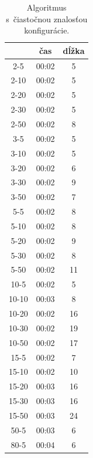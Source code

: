 \documentclass[
  printed, %
  oneside, %
  notable,   %
  nolof,     %
  nolot,     %
]{fithesis3}
\begin{document}
\begin{table}[hp!]
\centering
\begin{tabular}{c|c|c}
 & čas & dĺžka \\ \hline
2-5  & \cellcolor{table-green}00:02 & \cellcolor{table-green}5 \\ 
2-10  & \cellcolor{table-green}00:02 & \cellcolor{table-green}5 \\ 
2-20  & 00:02 & 5 \\
2-30  & 00:02 & 5 \\
2-50  & 00:02 & 8 \\ \hline 
3-5  & \cellcolor{table-green}00:02 & \cellcolor{table-green}5 \\ 
3-10  & \cellcolor{table-green}00:02 & \cellcolor{table-green}5 \\ 
3-20  & 00:02 & 6 \\
3-30  & \cellcolor{table-green}00:02 & \cellcolor{table-green}9 \\ 
3-50  & 00:02 & 7 \\ \hline 
5-5  & \cellcolor{table-green}00:02 & \cellcolor{table-green}8 \\ 
5-10  & 00:02 & 8 \\
5-20  & 00:02 & 9 \\
5-30  & 00:02 & 8 \\
5-50  & 00:02 & 11 \\ \hline 
10-5  & \cellcolor{table-green}00:02 & \cellcolor{table-green}5 \\ 
10-10  & 00:03 & 8 \\
10-20  & \cellcolor{table-green}00:02 & \cellcolor{table-green}16 \\ 
10-30  & 00:02 & 19 \\
10-50  & 00:02 & 17 \\ \hline
15-5  & 00:02 & 7 \\
15-10  & 00:02 & 10 \\
15-20  & 00:03 & 16 \\
15-30  & 00:03 & 16 \\
15-50  & 00:03 & 24 \\ \hline
50-5  & \cellcolor{table-green}00:03 & \cellcolor{table-green}6 \\ \hline
80-5  & \cellcolor{table-green}00:04 & \cellcolor{table-green}6 \\ 
\end{tabular}%
\caption{Algoritmus s~čiastočnou znalosťou konfigurácie. }
\label{tab:algo2}
\end{table}
\end{document}
